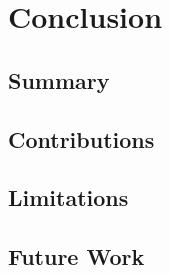 \section{Conclusion}

\subsection{Summary}

\subsection{Contributions}

\subsection{Limitations}

\subsection{Future Work}
